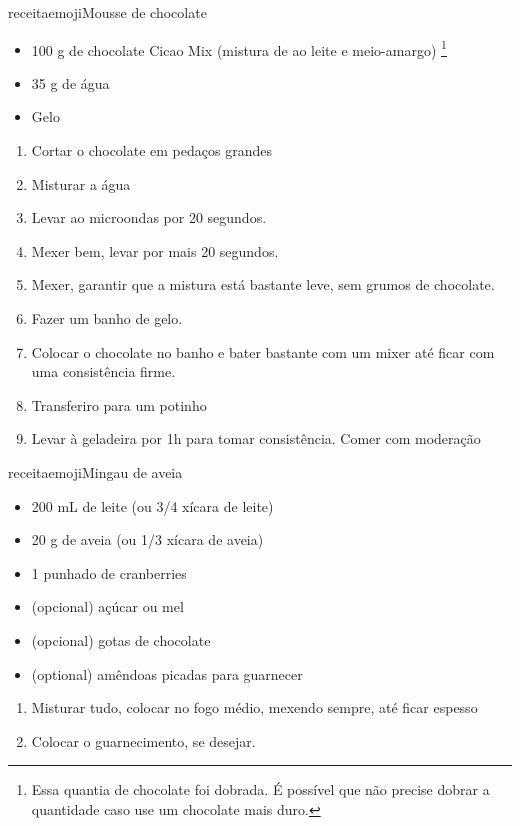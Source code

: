 receitaemoji{Mousse de chocolate\checkmark}{
	\begin{itemize}
		\item 100 g de chocolate Cicao Mix (mistura de ao leite e meio-amargo)
		      \footnote{Essa quantia de chocolate foi dobrada. É possível que não precise
			      dobrar a quantidade caso use um chocolate mais duro.}
		\item 35 g de água
		\item Gelo
	\end{itemize}
}{
	\begin{enumerate}
		\item Cortar o chocolate em pedaços grandes
		\item Misturar a água
		\item Levar ao microondas por 20 segundos.
		\item Mexer bem, levar por mais 20 segundos.
		\item Mexer, garantir que a mistura está bastante leve, sem grumos de
		      chocolate.
		\item Fazer um banho de gelo.
		\item  Colocar o chocolate no banho e bater bastante
		      com um mixer até ficar com uma consistência firme.
		\item Transferiro para um potinho
		\item Levar à geladeira por 1h para tomar consistência. Comer com moderação
	\end{enumerate}
}

receitaemoji{Mingau de aveia\checkmark}{
	\begin{itemize}
		\item 200 mL de leite (ou 3/4 xícara de leite)
		\item 20 g de aveia   (ou 1/3 xícara de aveia)
		\item 1 punhado de cranberries
		\item (opcional) açúcar ou mel
		\item (opcional) gotas de chocolate
		\item (optional) amêndoas picadas para guarnecer
	\end{itemize}
}{
	\begin{enumerate}
		\item Misturar tudo, colocar no fogo médio, mexendo sempre, até ficar espesso
		\item Colocar o guarnecimento, se desejar.
	\end{enumerate}
}

